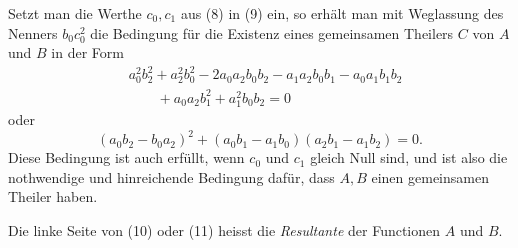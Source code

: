 \documentclass[11pt]{article}
\begin{document}
Setzt man die Werthe $c_0,c_1$ aus (8) in (9) ein, so erhält man mit Weglassung des Nenners $b_0c_0^2$ die Bedingung für die Existenz eines gemeinsamen Theilers $C$ von $A$ und $B$ in der Form
\begin{equation}
\begin{aligned}
&a_0^2b_2^2+a_2^2b_0^2-2a_0a_2b_0b_2-a_1a_2b_0b_1-a_0a_1b_1b_2\\
&\qquad{}+a_0a_2b_1^2+a_1^2b_0b_2=0
\end{aligned}
\tag{10}
\end{equation}
oder
\begin{equation}
 (a_0b_2-b_0a_2)^2+(a_0b_1-a_1b_0)(a_2b_1-a_1b_2)=0.
\tag{11}
\end{equation}
Diese Bedingung ist auch erfüllt, wenn $c_0$ und $c_1$ gleich Null sind, und ist also die nothwendige und hinreichende Bedingung dafür, dass $A,B$ einen gemeinsamen Theiler haben.

Die linke Seite von (10) oder (11) heisst die \emph{Resultante} der Functionen $A$ und $B$.
\end{document}

